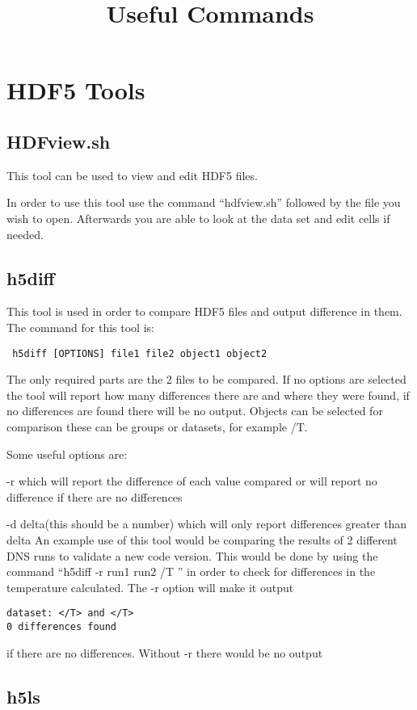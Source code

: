 \documentclass[12pt, oneside]{article}
\title{Useful Commands}
\author{}
\begin{document}
\section{HDF5 Tools}

\subsection{HDFview.sh}
This tool can be used to view and edit HDF5 files. 

\noindent In order to use this tool use the command ``hdfview.sh'' followed by the file you wish to open.
Afterwards you are able to look at the data set and edit cells if needed.

\subsection{h5diff}
This tool is used in order to compare HDF5 files and output difference in them. The command for this tool is:

\begin{verbatim}
 h5diff [OPTIONS] file1 file2 object1 object2
\end{verbatim}

\noindent The only required parts are the 2 files to be compared. If no options are selected the tool will report how many differences there are and
where they were found, if no differences are found there will be no output. Objects can be selected for comparison these can be groups or datasets, for example /T.

\noindent Some useful options are: 

-r which will report the difference of each value compared or will report no difference if there are no differences

-d delta(this should be a number)  which will only report differences greater than delta
\newline
An example use of this tool would be comparing the results of 2 different DNS runs to validate a new code version. This would be done by using the command
``h5diff -r run1 run2 /T '' in order to check for differences in the temperature calculated. The -r option will make it output 

\begin{verbatim}
dataset: </T> and </T>
0 differences found
\end{verbatim}
if there are no differences. Without -r there would be no output 


\subsection{h5ls}
\end{document}
